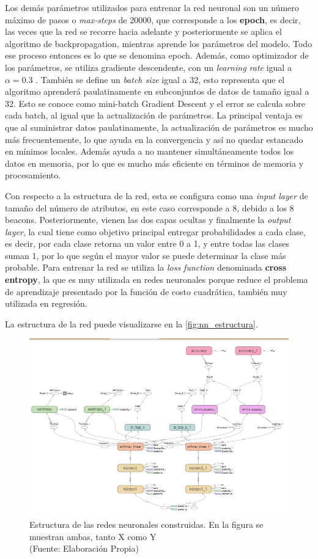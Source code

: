 Los demás parámetros utilizados para entrenar la red neuronal son un número máximo de pasos o \textit{max-steps} de 20000, que corresponde a los \textbf{epoch}, es decir, las veces que la red se recorre hacia adelante y posteriormente se aplica el algoritmo de backpropagation, mientras aprende los parámetros del modelo. Todo ese proceso entonces es lo que se denomina epoch. Además, como optimizador de los parámetros, se utiliza gradiente descendente, con un \textit{learning rate}  igual a $\alpha = 0.3$ . También se define un \textit{batch size} igual a 32, esto representa que el algoritmo aprenderá paulatinamente en subconjuntos de datos de tamaño igual a 32. Esto se conoce como mini-batch Gradient Descent y el error se calcula sobre cada batch, al igual que la actualización de parámetros. La principal ventaja es que al suministrar datos paulatinamente, la actualización de parámetros es mucho más frecuentemente, lo que ayuda en la convergencia y así no quedar estancado en mínimos locales. Además ayuda a no mantener simultáneamente todos los datos en memoria, por lo que es mucho más eficiente en términos de memoria y procesamiento.

Con respecto a la estructura de la red, esta se configura como una \textit{input layer} de tamaño del número de atributos, en este caso corresponde a 8, debido a los 8 beacons. Posteriormente, vienen las dos capas ocultas y finalmente la \textit{output layer}, la cual tiene como objetivo principal entregar probabilidades a cada clase, es decir, por cada clase retorna un valor entre 0 a 1, y entre todas las clases suman 1, por lo que según el mayor valor se puede determinar la clase más probable. Para entrenar la red se utiliza la \textit{loss function} denominada \textbf{cross entropy}, la que es muy utilizada en redes neuronales porque reduce el problema de aprendizaje presentado por la función de costo cuadrática, también muy utilizada en regresión.

La estructura de la red puede visualizarse en la \autoref{fig:nn_estructura}.

\begin{figure}[ht!]
\centering
\includegraphics[width=.6\textwidth]{figures/nn_estructura.png}
\caption[Estructura de las redes neuronales construidas]{Estructura de las redes neuronales construidas. En la figura se muestran ambas, tanto X como Y \\
{\scriptsize (Fuente: Elaboración Propia)}}
\label{fig:nn_estructura}
\end{figure}

